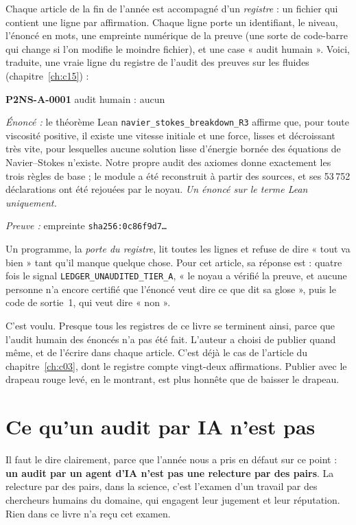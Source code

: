 Chaque article de la fin de l'année est accompagné d'un \emph{registre} : un fichier qui contient une ligne par
affirmation. Chaque ligne porte un identifiant, le niveau, l'énoncé en mots, une empreinte numérique de la preuve
(une sorte de code-barre qui change si l'on modifie le moindre fichier), et une case « audit humain ». Voici, traduite,
une vraie ligne du registre de l'audit des preuves sur les fluides (chapitre~\ref{ch:c15}) :

\begin{encadre}
\small
\textsf{\textbf{P2NS-A-0001}} \quad {} \quad \textsf{audit humain : aucun}\par\smallskip
\emph{Énoncé :} le théorème Lean \texttt{navier\_stokes\_breakdown\_R3} affirme que, pour toute viscosité positive, il
existe une vitesse initiale et une force, lisses et décroissant très vite, pour lesquelles aucune solution lisse
d'énergie bornée des équations de Navier--Stokes n'existe. Notre propre audit des axiomes donne exactement les trois
règles de base ; le module a été reconstruit à partir des sources, et ses 53\,752 déclarations ont été rejouées par le
noyau. \emph{Un énoncé sur le terme Lean uniquement.}\par\smallskip
\emph{Preuve :} empreinte \texttt{sha256:0c86f9d7\dots}
\end{encadre}

Un programme, la \emph{porte du registre}, lit toutes les lignes et refuse de dire « tout va bien » tant qu'il manque
quelque chose. Pour cet article, sa réponse est : quatre fois le signal \texttt{LEDGER\_UNAUDITED\_TIER\_A}, « le noyau a
vérifié la preuve, et aucune personne n'a encore certifié que l'énoncé veut dire ce que dit sa glose », puis le code de
sortie~1, qui veut dire « non ».

C'est voulu. Presque tous les registres de ce livre se terminent ainsi, parce que l'audit humain des énoncés n'a pas
été fait. L'auteur a choisi de publier quand même, et de l'écrire dans chaque article. C'est déjà le cas de
l'article du chapitre~\ref{ch:c03}, dont le registre compte vingt-deux affirmations. Publier avec le drapeau rouge
levé, en le montrant, est plus honnête que de baisser le drapeau.

\section{Ce qu'un audit par IA n'est pas}

Il faut le dire clairement, parce que l'année nous a pris en défaut sur ce point : \textbf{un audit par un agent d'IA
n'est pas une relecture par des pairs}. La relecture par des pairs, dans la science, c'est l'examen d'un travail par
des chercheurs humains du domaine, qui engagent leur jugement et leur réputation. Rien dans ce livre n'a reçu cet
examen.

